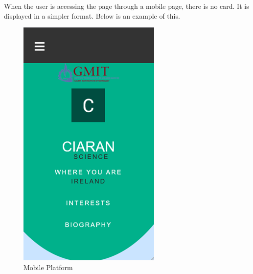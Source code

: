 When the user is accessing the page through a mobile page, there is no card. It is displayed in a simpler format. Below is an example of this. \\
\begin{figure}[H]
    \centering
    \includegraphics{img/home 3.png}
    \caption{Mobile Platform}
    \label{fig:my_label}
\end{figure}


